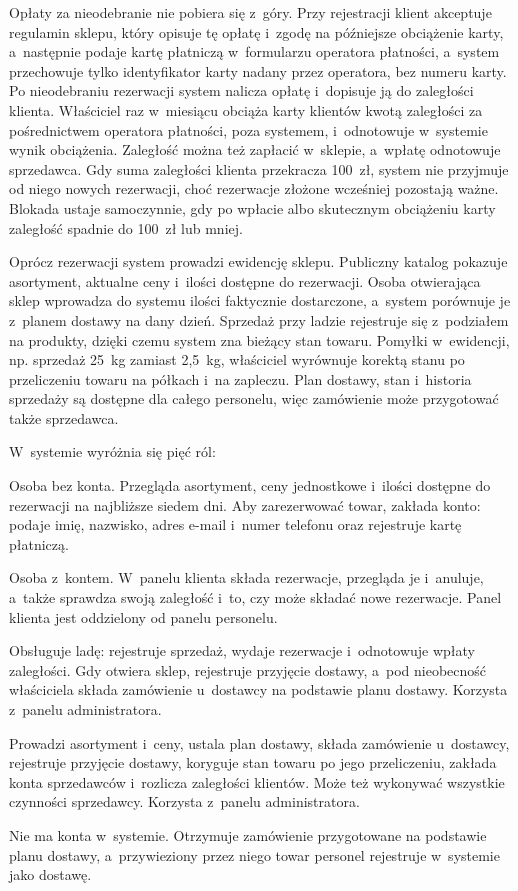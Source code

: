 \documentclass[12pt,a4paper,oneside]{article}
\newcounter{pu}
\begin{document}
Opłaty za nieodebranie nie pobiera się z~góry. Przy rejestracji klient akceptuje regulamin sklepu, który opisuje tę opłatę i~zgodę na późniejsze obciążenie karty, a~następnie podaje kartę płatniczą w~formularzu operatora płatności, a~system przechowuje tylko identyfikator karty nadany przez operatora, bez numeru karty. Po nieodebraniu rezerwacji system nalicza opłatę i~dopisuje ją do zaległości klienta. Właściciel raz w~miesiącu obciąża karty klientów kwotą zaległości za pośrednictwem operatora płatności, poza systemem, i~odnotowuje w~systemie wynik obciążenia. Zaległość można też zapłacić w~sklepie, a~wpłatę odnotowuje sprzedawca. Gdy suma zaległości klienta przekracza 100~zł, system nie przyjmuje od niego nowych rezerwacji, choć rezerwacje złożone wcześniej pozostają ważne. Blokada ustaje samoczynnie, gdy po wpłacie albo skutecznym obciążeniu karty zaległość spadnie do 100~zł lub mniej.

Oprócz rezerwacji system prowadzi ewidencję sklepu. Publiczny katalog pokazuje asortyment, aktualne ceny i~ilości dostępne do rezerwacji. Osoba otwierająca sklep wprowadza do systemu ilości faktycznie dostarczone, a~system porównuje je z~planem dostawy na dany dzień. Sprzedaż przy ladzie rejestruje się z~podziałem na produkty, dzięki czemu system zna bieżący stan towaru. Pomyłki w~ewidencji, np. sprzedaż 25~kg zamiast 2,5~kg, właściciel wyrównuje korektą stanu po przeliczeniu towaru na półkach i~na zapleczu. Plan dostawy, stan i~historia sprzedaży są dostępne dla całego personelu, więc zamówienie może przygotować także sprzedawca.

W~systemie wyróżnia się pięć ról:
\begin{description}[style=nextline,leftmargin=1.2cm]
	\item[Klient-obserwator] Osoba bez konta. Przegląda asortyment, ceny jednostkowe i~ilości dostępne do rezerwacji na najbliższe siedem dni. Aby zarezerwować towar, zakłada konto: podaje imię, nazwisko, adres e-mail i~numer telefonu oraz rejestruje kartę płatniczą.
	\item[Klient] Osoba z~kontem. W~panelu klienta składa rezerwacje, przegląda je i~anuluje, a~także sprawdza swoją zaległość i~to, czy może składać nowe rezerwacje. Panel klienta jest oddzielony od panelu personelu.
	\item[Sprzedawca] Obsługuje ladę: rejestruje sprzedaż, wydaje rezerwacje i~odnotowuje wpłaty zaległości. Gdy otwiera sklep, rejestruje przyjęcie dostawy, a~pod nieobecność właściciela składa zamówienie u~dostawcy na podstawie planu dostawy. Korzysta z~panelu administratora.
	\item[Właściciel] Prowadzi asortyment i~ceny, ustala plan dostawy, składa zamówienie u~dostawcy, rejestruje przyjęcie dostawy, koryguje stan towaru po jego przeliczeniu, zakłada konta sprzedawców i~rozlicza zaległości klientów. Może też wykonywać wszystkie czynności sprzedawcy. Korzysta z~panelu administratora.
	\item[Dostawca] Nie ma konta w~systemie. Otrzymuje zamówienie przygotowane na podstawie planu dostawy, a~przywieziony przez niego towar personel rejestruje w~systemie jako dostawę.
\end{description}
\end{document}
